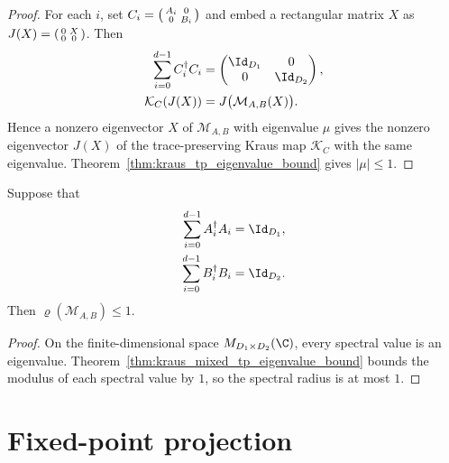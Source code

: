 \begin{proof}\leanok
    For each $i$, set
    $C_i=\begin{psmallmatrix}A_i&0\\0&B_i\end{psmallmatrix}$ and embed a
    rectangular matrix $X$ as
    $J(X)=\begin{psmallmatrix}0&X\\0&0\end{psmallmatrix}$. Then
    \begin{align}
        \sum_{i=0}^{d-1}C_i^\dagger C_i
         &=\begin{pmatrix}\Id_{D_1}&0\\0&\Id_{D_2}\end{pmatrix},
        \notag\\
        \mathcal K_C(J(X))
         &=J\bigl(\mathcal M_{A,B}(X)\bigr).
        \notag
    \end{align}
    Hence a nonzero eigenvector $X$ of $\mathcal M_{A,B}$ with eigenvalue
    $\mu$ gives the nonzero eigenvector $J(X)$ of the trace-preserving Kraus
    map $\mathcal K_C$ with the same eigenvalue.
    Theorem~\ref{thm:kraus_tp_eigenvalue_bound} gives $|\mu|\leq1$.
\end{proof}

\begin{theorem}
    \label{thm:kraus_mixed_tp_spectral_radius_bound}
    \leanok
    Suppose that
    \begin{align}
        \sum_{i=0}^{d-1}A_i^\dagger A_i&=\Id_{D_1},
        \notag\\
        \sum_{i=0}^{d-1}B_i^\dagger B_i&=\Id_{D_2}.
        \notag
    \end{align}
    Then $\varrho(\mathcal M_{A,B})\leq1$.
\end{theorem}

\begin{proof}\leanok
    On the finite-dimensional space $M_{D_1\times D_2}(\C)$, every spectral
    value is an eigenvalue. Theorem~\ref{thm:kraus_mixed_tp_eigenvalue_bound}
    bounds the modulus of each spectral value by $1$, so the spectral radius
    is at most $1$.
\end{proof}

\section{Fixed-point projection}

